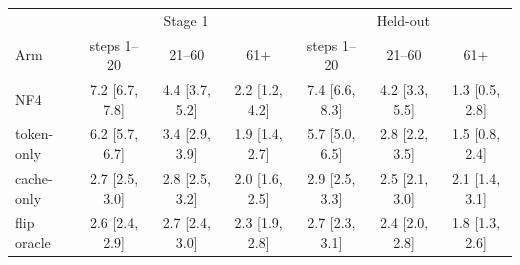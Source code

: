 \begin{tabular}{lcccccc}
\toprule
 & \multicolumn{3}{c}{Stage 1} & \multicolumn{3}{c}{Held-out} \\
Arm & steps 1--20 & 21--60 & 61+ & steps 1--20 & 21--60 & 61+ \\
\midrule
NF4 & 7.2 [6.7, 7.8] & 4.4 [3.7, 5.2] & 2.2 [1.2, 4.2] & 7.4 [6.6, 8.3] & 4.2 [3.3, 5.5] & 1.3 [0.5, 2.8] \\
token-only & 6.2 [5.7, 6.7] & 3.4 [2.9, 3.9] & 1.9 [1.4, 2.7] & 5.7 [5.0, 6.5] & 2.8 [2.2, 3.5] & 1.5 [0.8, 2.4] \\
cache-only & 2.7 [2.5, 3.0] & 2.8 [2.5, 3.2] & 2.0 [1.6, 2.5] & 2.9 [2.5, 3.3] & 2.5 [2.1, 3.0] & 2.1 [1.4, 3.1] \\
flip oracle & 2.6 [2.4, 2.9] & 2.7 [2.4, 3.0] & 2.3 [1.9, 2.8] & 2.7 [2.3, 3.1] & 2.4 [2.0, 2.8] & 1.8 [1.3, 2.6] \\
\bottomrule
\end{tabular}
